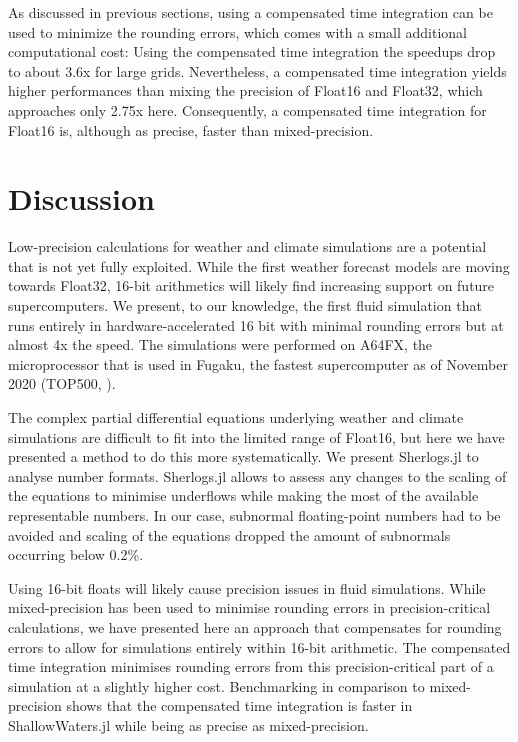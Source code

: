 As discussed in previous sections, using a compensated time integration can be used to minimize the rounding errors,
which comes with a small additional computational cost: Using the compensated time integration the speedups drop to
about 3.6x for large grids. Nevertheless, a compensated time integration yields higher performances than mixing the
precision of Float16 and Float32, which approaches only 2.75x here. Consequently, a compensated time integration
for Float16 is, although as precise, faster than mixed-precision.

\section{Discussion}
\label{sec:hardware_discussion}

Low-precision calculations for weather and climate simulations are a potential that is not yet fully exploited.
While the first weather forecast models are moving towards Float32, 16-bit arithmetics will likely find increasing
support on future supercomputers. We present, to our knowledge, the first fluid simulation that runs entirely in
hardware-accelerated 16 bit with minimal rounding errors but at almost 4x the speed. The simulations were
performed on A64FX, the microprocessor that is used in Fugaku, the fastest supercomputer as of November
2020 (TOP500, \cite{Dongarra2011}).

The complex partial differential equations underlying weather and climate simulations are difficult to fit into the
limited range of Float16, but here we have presented a method to do this more systematically. We present 
Sherlogs.jl to analyse number formats. Sherlogs.jl allows to assess any changes to the scaling of the equations
to minimise underflows while making the most of the available representable numbers. In our case,
subnormal floating-point numbers had to be avoided and scaling of the equations dropped the amount of
subnormals occurring below 0.2\%.

Using 16-bit floats will likely cause precision issues in fluid simulations. While mixed-precision has been
used to minimise rounding errors in precision-critical calculations, we have presented here an approach
that compensates for rounding errors to allow for simulations entirely within 16-bit arithmetic.
The compensated time integration minimises rounding errors from this precision-critical part of a simulation
at a slightly higher cost. Benchmarking in comparison to mixed-precision shows that the compensated
time integration is faster in ShallowWaters.jl while being as precise as mixed-precision.

